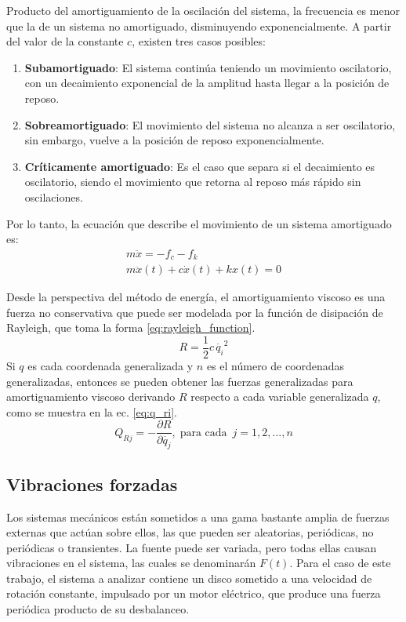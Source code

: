 Producto del amortiguamiento de la oscilación del sistema, la frecuencia es menor que la de un sistema no amortiguado, disminuyendo exponencialmente. A partir del valor de la constante $c$, existen tres casos posibles:
\begin{enumerate}
	\item \textbf{Subamortiguado}: El sistema continúa teniendo un movimiento oscilatorio, con un decaimiento exponencial de la amplitud hasta llegar a la posición de reposo.
	\item \textbf{Sobreamortiguado}: El movimiento del sistema no alcanza a ser oscilatorio, sin embargo, vuelve a la posición de reposo exponencialmente.
	\item \textbf{Críticamente amortiguado}: Es el caso que separa si el decaimiento es oscilatorio, siendo el movimiento que retorna al reposo más rápido sin oscilaciones.
\end{enumerate}

Por lo tanto, la ecuación que describe el movimiento de un sistema amortiguado es:
\begin{gather*}
	m\ddot{x} = -f_c - f_k \\
	m\ddot{x}(t) + c\dot{x}(t) + kx(t) = 0 
\end{gather*}

Desde la perspectiva del método de energía, el amortiguamiento viscoso es una fuerza no conservativa que puede ser modelada por la función de disipación de Rayleigh, que toma la forma \ref{eq:rayleigh_function}.
\begin{equation}\label{eq:rayleigh_function}
	R = \frac{1}{2}c\,\dot{q_i}^2
\end{equation} 
Si $q$ es cada coordenada generalizada y $n$ es el número de coordenadas generalizadas, entonces se pueden obtener las fuerzas generalizadas para amortiguamiento viscoso derivando $R$ respecto a cada variable generalizada $q$, como se muestra en la ec. \ref{eq:q_ri}.
\begin{equation}\label{eq:q_ri}
	Q_{Rj} = -\frac{\partial R}{\partial \dot{q_j}}, \; \text{para cada }\, j=1,2,...,n
\end{equation}

\subsection{Vibraciones forzadas}
\label{sec:vib_forzadas}
Los sistemas mecánicos están sometidos a una gama bastante amplia de fuerzas externas que actúan sobre ellos, las que pueden ser aleatorias, periódicas, no periódicas o transientes. La fuente puede ser variada, pero todas ellas causan vibraciones en el sistema, las cuales se denominarán $F(t)$. Para el caso de este trabajo, el sistema a analizar contiene un disco sometido a una velocidad de rotación constante, impulsado por un motor eléctrico, que produce una fuerza periódica producto de su desbalanceo.

